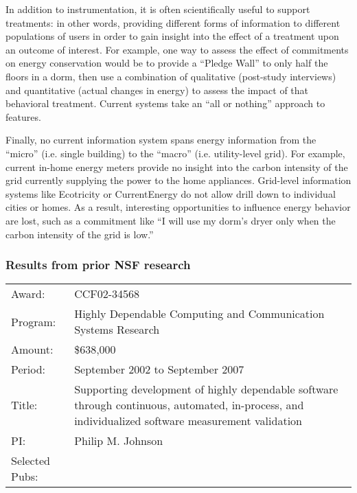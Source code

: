 In addition to instrumentation, it is often scientifically useful to
support treatments: in other words, providing different forms of
information to different populations of users in order to gain insight into
the effect of a treatment upon an outcome of interest. For example, one way
to assess the effect of commitments on energy conservation would be to
provide a ``Pledge Wall'' to only half the floors in a dorm, then use a
combination of qualitative (post-study interviews) and quantitative (actual
changes in energy) to assess the impact of that behavioral
treatment. Current systems take an ``all or nothing'' approach to
features. 

Finally, no current information system spans energy information from the ``micro''
(i.e. single building) to the ``macro'' (i.e. utility-level grid).  For
example, current in-home energy meters provide no insight into the carbon
intensity of the grid currently supplying the power to the home appliances.
Grid-level information systems like Ecotricity or CurrentEnergy do not
allow drill down to individual cities or homes.  As a result, interesting
opportunities to influence energy behavior are lost, such as a commitment
like ``I will use my dorm's dryer only when the carbon intensity of the
grid is low.''

\subsubsection{Results from prior NSF research}

\small
\begin{tabular}{p{1in}p{5in}}
Award: & CCF02-34568 \\ 
Program: & Highly Dependable Computing and Communication Systems Research\\ 
Amount: & \$638,000 \\ 
Period: & September 2002 to September 2007 \\ 
Title: & Supporting development of highly dependable software through
continuous, automated, in-process, and individualized software measurement validation \\ 
PI: & Philip M. Johnson \\ 
Selected Pubs: & \cite{csdl2-04-22,csdl2-04-13,csdl2-04-11,csdl2-03-12,
csdl2-02-07,csdl2-03-07,csdl2-04-02,csdl2-04-04,csdl2-04-11,csdl2-06-07,csdl2-06-08,csdl2-06-13,csdl2-06-06,csdl2-09-01}
\end{tabular} \\ %
\normalsize

